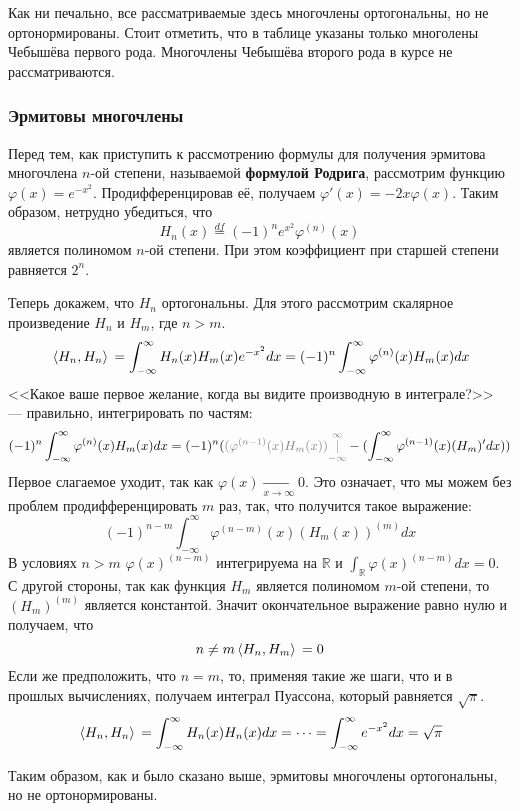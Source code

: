	Как ни печально, все рассматриваемые здесь многочлены ортогональны, но не ортонормированы.
	Стоит отметить, что в таблице указаны только многолены Чебышёва первого рода. Многочлены Чебышёва второго рода в курсе 
	не рассматриваются.
	
	\subsubsection{Эрмитовы многочлены}
	
	Перед тем, как приступить к рассмотрению формулы для получения эрмитова многочлена $n$-ой степени, называемой 
	\textbf{формулой Родрига}, рассмотрим функцию $\varphi(x) = e^{-x^2}$. Продифференцировав её, получаем 
	$\varphi'(x) = -2x \varphi(x)$. Таким образом, нетрудно убедиться, что
	$$H_n(x) \overset{df}{=} (-1)^n e^{x^2} \varphi^{(n)} (x)$$
	является полиномом $n$-ой степени. При этом коэффициент при старшей степени равняется $2^n$.
	
	Теперь докажем, что $H_n$ ортогональны. Для этого рассмотрим скалярное произведение $H_n$ и $H_m$, где $n > m$.
	$$\, \langle H_n, H_n \rangle \, = \int_{-\infty}^{\infty} H_n(x) H_m(x) e^{-x^2} dx = (-1)^n \int_{-\infty}^{\infty} \varphi^{(n)}(x) H_m(x) dx$$
	<<Какое ваше первое желание, когда вы видите производную в интеграле?>> --- правильно, интегрировать по частям:
	$$(-1)^n \int_{-\infty}^{\infty} \varphi^{(n)}(x) H_m(x) dx = (-1)^n ( {\color{gray}(\varphi^{(n-1)}(x) H_m(x)) 
	\underset{-\infty}{\overset{\infty}{|}}} - (\int_{-\infty}^{\infty} \varphi^{(n-1)}(x) (H_m)' dx ) )$$
	Первое слагаемое уходит, так как $\varphi(x) \underset{x \rightarrow \infty}{\rightarrow} 0$. Это означает, что мы можем без проблем
	продифференцировать $m$ раз, так, что получится такое выражение:
	$$(-1)^{n-m} \int_{-\infty}^{\infty} \varphi^{(n-m)}(x) (H_m(x))^{(m)} dx$$
	В условиях $n > m$ $\varphi(x)^{(n-m)}$ интегрируема на $\mathbb{R}$ и $\int_{\mathbb{R}} \varphi(x)^{(n-m)} dx = 0$. С другой 
	стороны, так как функция $H_m$ является полиномом $m$-ой степени, то $(H_m)^{(m)}$ является константой. Значит окончательное выражение
	равно нулю и получаем, что
	$$n \neq m \, \langle H_n, H_m \rangle \, = 0$$
	Если же предположить, что $n=m$, то, применяя такие же шаги, что и в прошлых вычислениях, получаем интеграл Пуассона, который 
	равняется $\sqrt{\pi}$.
	$$\, \langle H_n, H_n \rangle \, = \int_{-\infty}^{\infty} H_n(x) H_n(x) dx = \dots = \int_{-\infty}^{\infty} e^{-x^2} dx = \sqrt{\pi}$$
	
	Таким образом, как и было сказано выше, эрмитовы многочлены ортогональны, но не ортонормированы.
	

